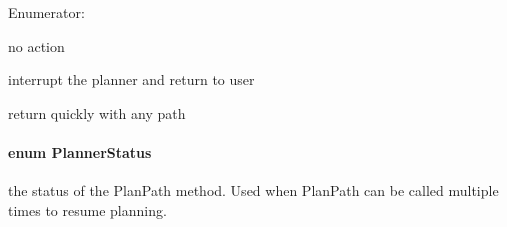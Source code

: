 \begin{Desc}
\item[Enumerator: ]\par
\begin{description}
\item[{\em 
\hypertarget{namespaceOpenRAVE_a16104fe58cdf1075c47eb709e58ba853a64ec1b874d3088ceef9bd5051c65889f}{
PA\_\-None}
\label{namespaceOpenRAVE_a16104fe58cdf1075c47eb709e58ba853a64ec1b874d3088ceef9bd5051c65889f}
}]no action \item[{\em 
\hypertarget{namespaceOpenRAVE_a16104fe58cdf1075c47eb709e58ba853a39d503ce662ac46ebdb9fc6e55ca7a5a}{
PA\_\-Interrupt}
\label{namespaceOpenRAVE_a16104fe58cdf1075c47eb709e58ba853a39d503ce662ac46ebdb9fc6e55ca7a5a}
}]interrupt the planner and return to user \item[{\em 
\hypertarget{namespaceOpenRAVE_a16104fe58cdf1075c47eb709e58ba853adcf80ca3a0125b7e5de795d605ab7ffe}{
PA\_\-ReturnWithAnySolution}
\label{namespaceOpenRAVE_a16104fe58cdf1075c47eb709e58ba853adcf80ca3a0125b7e5de795d605ab7ffe}
}]return quickly with any path \end{description}
\end{Desc}

\hypertarget{namespaceOpenRAVE_a7cead738b92cbe2f332dea20dd2f200e}{
\paragraph[{PlannerStatus}]{\setlength{\rightskip}{0pt plus 5cm}enum {\bf PlannerStatus}}\hfill}
\label{namespaceOpenRAVE_a7cead738b92cbe2f332dea20dd2f200e}


the status of the PlanPath method. Used when PlanPath can be called multiple times to resume planning. 

